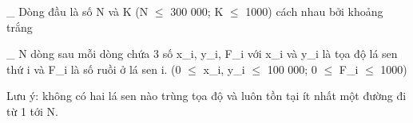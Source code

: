 \_ Dòng đầu là số N và K (N $\le$ 300 000; K $\le$ 1000) cách nhau bởi khoảng trắng   


   \_ N dòng sau mỗi dòng chứa 3 số x\_i, y\_i, F\_i với x\_i và y\_i là tọa độ lá sen thứ i và F\_i là số ruồi ở lá sen i.  (0  $\le$  x\_i, y\_i  $\le$  100 000; 0  $\le$  F\_i  $\le$ 1000)   


   Lưu ý: không có hai lá sen nào trùng tọa độ và luôn tồn tại ít nhất một đường đi từ 1 tới N.